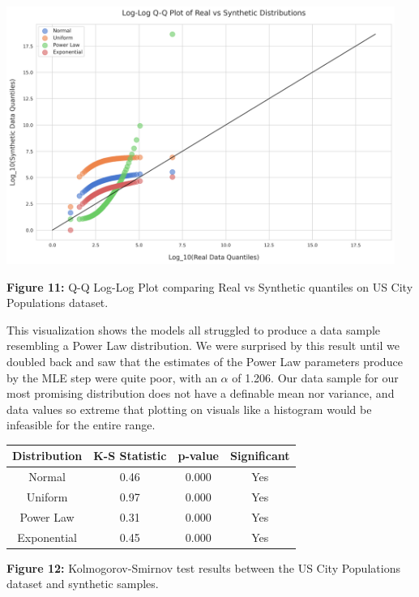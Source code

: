 \begin{center}
  \includegraphics[width=0.95\textwidth]{figures/powerlaw/qqplot_loglog.png}
  
  \textbf{Figure 11:} Q-Q Log-Log Plot comparing Real vs Synthetic quantiles on US City Populations dataset.
\end{center}

This visualization shows the models all struggled to produce a data sample resembling a Power Law distribution. We were surprised by this result until we doubled back and saw that the estimates of the Power Law parameters produce by the MLE step were quite poor, with an $ \alpha $ of 1.206. Our data sample for our most promising distribution does not have a definable mean nor variance, and data values so extreme that plotting on visuals like a histogram would be infeasible for the entire range.\\

\begin{center}
\begin{tabular}{|c|c|c|c|}
\hline
\textbf{Distribution} & \textbf{K-S Statistic} & \textbf{p-value} & \textbf{Significant} \\
\hline
Normal & 0.46 & 0.000 & Yes \\
\hline
Uniform & 0.97 & 0.000 & Yes \\
\hline
Power Law & 0.31 & 0.000 & Yes \\
\hline
Exponential & 0.45 & 0.000 & Yes \\
\hline
\end{tabular}
\end{center}

\begin{center}
\textbf{Figure 12:} Kolmogorov-Smirnov test results between the US City Populations dataset and synthetic samples.
\end{center}

